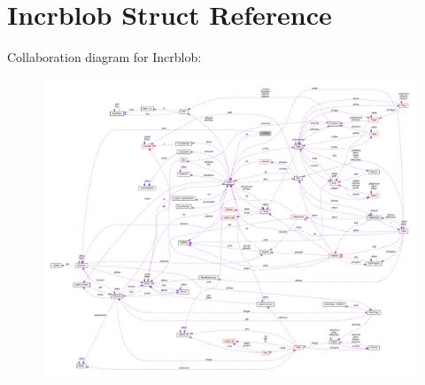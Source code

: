 \hypertarget{struct_incrblob}{\section{Incrblob Struct Reference}
\label{struct_incrblob}
}


Collaboration diagram for Incrblob\-:\nopagebreak
\begin{figure}[H]
\begin{center}
\leavevmode
\includegraphics[width=350pt]{struct_incrblob__coll__graph}
\end{center}
\end{figure}
